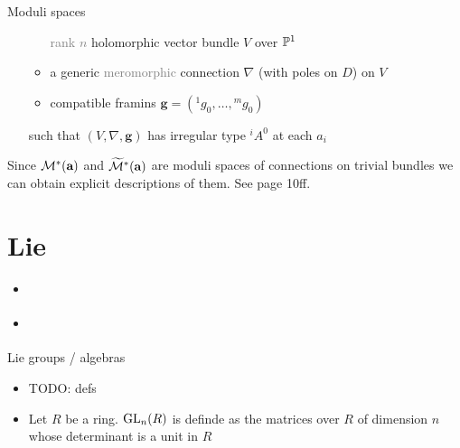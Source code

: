 \begin{frame}{Moduli spaces}
\begin{defn}[2.6]
\begin{itemize}
\begin{itemize}
            \textcolor{gray}{rank $n$} holomorphic vector bundle $V$ over $\P^1$
          \item a generic \textcolor{gray}{meromorphic} connection $\nabla$
            (with poles on $D$) on $V$
          \item compatible framins $\textbf{g}=({}^1g_0,\dots,{}^mg_0)$
        \end{itemize}
        such that $(V,\nabla,\textbf{g})$ has irregular type ${}^iA^0$ at each
        $a_i$
    \end{itemize}
  \end{defn}
  Since $\cM^*(\textbf{a})$ and $\widetilde\cM^*(\textbf{a})$ are moduli spaces
  of connections on trivial bundles we can obtain explicit descriptions of
  them. See \cite{sabbah_cimpa90} page 10ff.
\end{frame}

\section{Lie}%
\begin{frame}
  {\Huge\insertsection{}}
  \begin{itemize}
    \item \cite{boalch}
    \item \cite{thboalch}
  \end{itemize}
\end{frame}

\begin{frame}{Lie groups / algebras}
  \begin{itemize}
    \item TODO: defs
    \item Let $R$ be a ring. $\GL_n(R)$ is definde as the matrices
      over $R$ of dimension $n$ whose determinant is a unit in $R$
  \end{itemize}
\end{frame}

